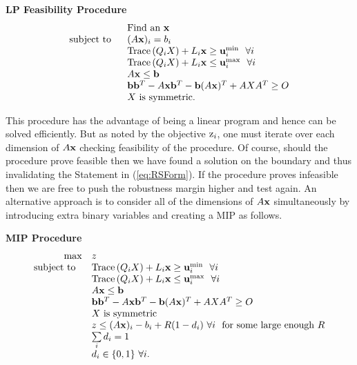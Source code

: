 \bigskip
\bigskip
\textbf{LP Feasibility Procedure} 
\begin{equation} \label{eq:OPTfeasrelaxLP1}
\begin{array}{rl}
 &\text{Find an }\mathbf{x} \\
 \text{subject to } \ &(A\mathbf{x})_i= b_i \\
 &\operatorname{Trace}\left(Q_iX\right)+ L_i\mathbf{x} \geq \mathbf{u}_i^{\min}  \ \ \forall i\\
 & \operatorname{Trace}\left(Q_iX\right)+ L_i\mathbf{x} \leq \mathbf{u}_i^{\max}  \ \ \forall i\\
 	&A\mathbf{x}\leq \mathbf{b} \\
 	&\mathbf{b}\mathbf{b}^T-A\mathbf{x}\mathbf{b}^T-\mathbf{b}(A\mathbf{x})^T+AXA^T\geq O \\
 	&X \text{ is symmetric.}
\end{array}
\end{equation}


This procedure has the advantage of being a linear program and hence can be solved efficiently.
But as noted by the objective $\mathrm{z}_i$, one must iterate over each dimension of $A\mathbf{x}$ checking feasibility of the procedure. 
Of course, should the procedure prove feasible then we have found a solution on the boundary and thus invalidating the Statement in (\cref{eq:RSForm}). 
If the procedure proves infeasible then we are free to push the robustness margin higher and test again. 
An alternative approach is to consider all of the dimensions of $A\mathbf{x}$ simultaneously by introducing extra binary variables and creating a MIP as follows. 

\bigskip
\textbf{MIP Procedure}\
\begin{equation}\label{eq:OPTfeasrelaxLP2}
\begin{array}{rl}
\max &  z  \\
 \text{subject to } \ &\operatorname{Trace}\left(Q_iX\right)+ L_i\mathbf{x} \geq \mathbf{u}_i^{\min}  \ \ \forall i\\
 & \operatorname{Trace}\left(Q_iX\right)+ L_i\mathbf{x} \leq \mathbf{u}_i^{\max}  \ \ \forall i\\
 	&A\mathbf{x}\leq \mathbf{b} \\
 	&\mathbf{b}\mathbf{b}^T-A\mathbf{x}\mathbf{b}^T-\mathbf{b}(A\mathbf{x})^T+AXA^T\geq O \\
 	&X \text{ is symmetric} \\
 	& z\leq (A\mathbf{x})_i-b_i+R(1-d_i) \ \forall i \ \text{ for some large enough $R$} \\
 	& \sum\limits_i d_i=1 \\
 	& d_i\in\{0,1\} \ \forall i .
\end{array}
\end{equation}



